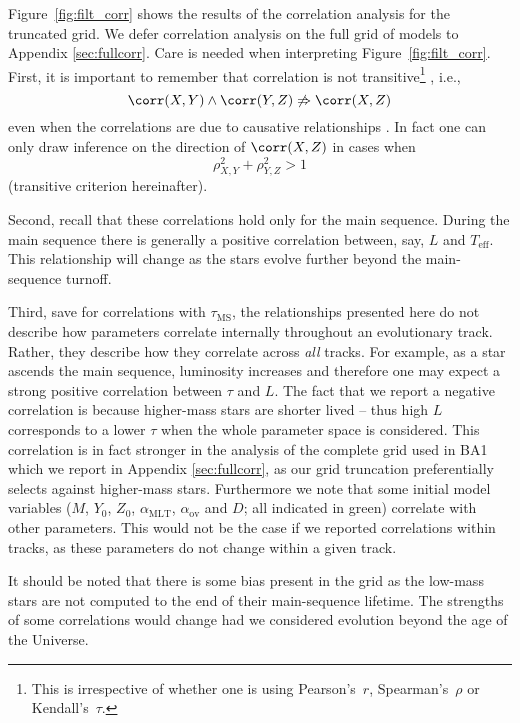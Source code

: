 Figure~\ref{fig:filt_corr} shows the results of the correlation analysis for the truncated grid.
We defer correlation analysis on the full grid of models to Appendix \ref{sec:fullcorr}. 
Care is needed when interpreting Figure~\ref{fig:filt_corr}. 
First, it is important to remember that correlation is not transitive\footnote{This is irrespective of whether one is using Pearson's~$r$, Spearman's~$\rho$ or Kendall's~$\tau$.} \citep{lang}, i.e.,
\begin{equation}
\corr(X,Y) \wedge \corr(Y,Z) \not \Rightarrow \corr(X,Z)
\end{equation}
even when the correlations are due to causative relationships \citep{stav}.
In fact one can only draw inference on the direction of ${\corr(X,Z)}$ in cases when 
\begin{equation}
\rho_{X,Y}^2 + \rho_{Y,Z}^2 > 1
\end{equation}
(transitive criterion hereinafter).

Second, recall that these correlations hold only for the main sequence. During the main sequence there is generally a positive correlation between, say, $L$ and $T_{\text{eff}}$. 
This relationship will change as the stars evolve further beyond the main-sequence turnoff. 

Third, save for correlations with $\tau_{\text{MS}}$, the relationships presented here do not describe how parameters correlate internally throughout an evolutionary track. Rather, they describe how they correlate across \emph{all} tracks. For example, as a star ascends the main sequence, luminosity increases and therefore one may expect a strong positive correlation between $\tau$ and $L$. The fact that we report a negative correlation is because higher-mass stars are shorter lived -- thus high $L$ corresponds to a lower $\tau$  when the whole parameter space is considered. This correlation is in fact stronger in the analysis of the complete grid used in BA1 which we report in Appendix \ref{sec:fullcorr}, as our grid truncation preferentially selects against higher-mass stars. 
Furthermore we note that some initial model variables ($M$, $Y_0$, $Z_0$, $\alpha_{\text{MLT}}$, $\alpha_{\text{ov}}$ and $D$; all indicated in green) correlate with other parameters.  This would not be the case if we reported correlations within tracks, as these parameters do not change within a given track. 

It should be noted that there is some bias present in the grid as the low-mass stars are not computed to the end of their main-sequence lifetime. The strengths of some correlations would change had we considered evolution beyond the age of the Universe. 
